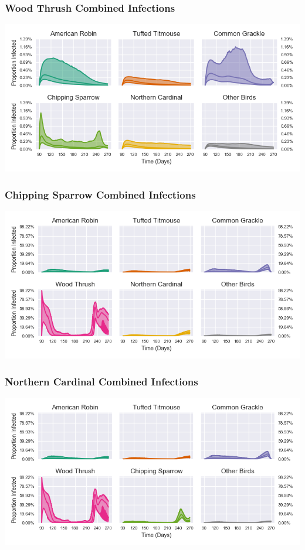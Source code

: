 \documentclass{beamer}
\begin{document}
\begin{frame}
\frametitle{Wood Thrush Combined Infections}
\includegraphics[width=\linewidth]{[3,6]_infections.png}
\end{frame}

\begin{frame}
\frametitle{Chipping Sparrow Combined Infections}
\includegraphics[width=\linewidth]{[4,6]_infections.png}
\end{frame}

\begin{frame}
\frametitle{Northern Cardinal Combined Infections}
\includegraphics[width=\linewidth]{[5,6]_infections.png}
\end{frame}
\end{document}
